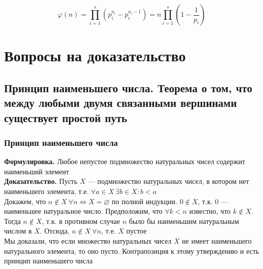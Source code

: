 \documentclass[a4paper]{article}
\begin{document}
$$
\varphi(n)=\prod_{i=1}^{s}\left(p_{i}^{a_{i}}-p_{i}^{a_{i}-1}\right)=n \prod_{i=1}^{s}\left(1-\frac{1}{p_{i}}\right)
$$












\newpage
\section{Вопросы на доказательство}
\subsection{Принцип наименьшего числа. Теорема о том, что между любыми двумя связанными вершинами существует простой путь}
\subsubsection*{Принцип наименьшего числа}
\textbf{Формулировка.} Любое непустое подмножество натуральных чисел содержит наименьший элемент\\[2mm]
\indent\textbf{Доказательство.} Пусть $X$ — подмножество натуральных чисел, в котором нет наименьшего элемента, т.е. $\forall a\in X\ \exists b\in X:b<a$\\[2mm]
\indent Докажем, что $n\notin X\ \forall n\iff X=\varnothing$ по полной индукции. $0\notin X$, т.к. 0 — наименьшее натуральное число. Предположим, что $\forall k<n$ известно, что $k\notin X$. Тогда $n\notin X$, т.к. в противном случае $n$ было бы наименьшим натуральным числом в $X$. Отсюда, $n\notin X\ \forall n$, т.е. $X$ пустое\\[2mm]
\indent Мы доказали, что если множество натуральных чисел $X$ не имеет наименьшего натурального элемента, то оно пусто. Контрапозиция к этому утверждению и есть принцип наименьшего числа
\end{document}
